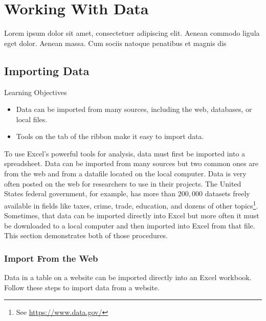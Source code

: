 \chapter{Working With Data}\label{ch07:data}

Lorem ipsum dolor sit amet, consectetuer adipiscing elit. Aenean commodo ligula eget dolor. Aenean massa. Cum sociis natoque penatibus et magnis dis 

\section{Importing Data}

\begin{center}
	\begin{objbox}{Learning Objectives}
		\begin{itemize}
			\setlength{\itemsep}{0pt}
			\setlength{\parskip}{0pt}
			\setlength{\parsep}{0pt}
			
			\item Data can be imported from many sources, including the web, databases, or local files.
			\item Tools on the  tab of the ribbon make it easy to import data.

		\end{itemize}
	\end{objbox}
\end{center}

To use Excel's powerful tools for analysis, data must first be imported into a spreadsheet. Data can be imported from many sources but two common ones are from the web and from a datafile located on the local computer. Data is very often posted on the web for researchers to use in their projects. The United States federal government, for example, has more than $ 200,000 $ datasets freely available in fields like taxes, crime, trade, education, and dozens of other topics\footnote{See \url{https://www.data.gov/}}. Sometimes, that data can be imported directly into Excel but more often it must be downloaded to a local computer and then imported into Excel from that file. This section demonstrates both of those procedures.

\subsection{Import From the Web}

Data in a table on a website can be imported directly into an Excel workbook. Follow these steps to import data from a website.

